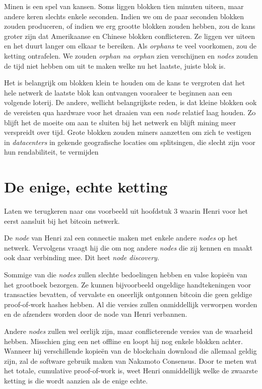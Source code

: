 \documentclass[smalldemyvopaper,11pt,twoside,onecolumn,openright,extrafontsizes]{memoir}
\begin{document}
Minen is een spel van kansen. Soms liggen blokken tien minuten uiteen, maar andere keren slechts enkele seconden. Indien we om de paar seconden blokken zouden produceren, of indien we erg grootte blokken zouden hebben, zou de kans groter zijn dat Amerikaanse en Chinese blokken conflicteren. Ze liggen ver uiteen en het duurt langer om elkaar te bereiken. Als \textit{orphans} te veel voorkomen, zou de ketting ontrafelen. We zouden \textit{orphan na orphan} zien verschijnen en \textit{nodes} zouden de tijd niet hebben om uit te maken welke nu het laatste, juiste blok is.

Het is belangrijk om blokken klein te houden om de kans te vergroten dat het hele netwerk de laatste blok kan ontvangen vooraleer te beginnen aan een volgende loterij. De andere, wellicht belangrijkste reden, is dat kleine blokken ook de vereisten qua hardware voor het draaien van een \textit{node} relatief laag houden. Zo blijft het de moeite om aan te sluiten bij het netwerk en blijft mining meer verspreidt over tijd. Grote blokken zouden miners aanzetten om zich te vestigen in \textit{datacenters} in gekende geografische locaties om splitsingen, die slecht zijn voor hun rendabiliteit, te vermijden

\section{De enige, echte ketting}
Laten we terugkeren naar ons voorbeeld uit hoofdstuk 3 waarin Henri voor het eerst aansluit bij het bitcoin netwerk.

De \textit{node} van Henri zal een connectie maken met enkele andere \textit{nodes} op het netwerk. Vervolgens vraagt hij die om nog andere \textit{nodes} die zij kennen en maakt ook daar verbinding mee. Dit heet \textit{node discovery}.

Sommige van die \textit{nodes} zullen slechte bedoelingen hebben en valse kopieën van het grootboek bezorgen. Ze kunnen bijvoorbeeld ongeldige handtekeningen voor transacties bevatten, of vervalste en oneerlijk ontgonnen bitcoin die geen geldige proof-of-work hashes hebben. Al die versies zullen onmiddellijk verworpen worden en de afzenders worden door de node van Henri verbannen.

Andere \textit{nodes} zullen wel eerlijk zijn, maar conflicterende versies van de waarheid hebben. Misschien ging een net offline en loopt hij nog enkele blokken achter. Wanneer hij verschillende kopieën van de blockchain download die allemaal geldig zijn, zal de software gebruik maken van Nakamoto Consensus. Door te meten wat het totale, cumulative proof-of-work is, weet Henri onmiddellijk welke de zwaarste ketting is die wordt aanzien als de enige echte.
\end{document}
